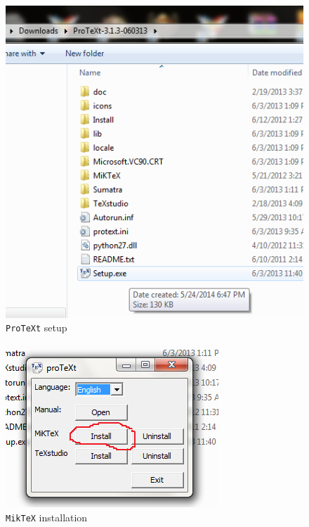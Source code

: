 \documentclass[12pt,a4paper]{article}
\begin{document}
\begin{figure}[H]
\centering
\includegraphics[scale=1.0]{ProTeXtSetup.png}
\caption{\texttt{ProTeXt} setup}
\label{protext-setup}
\end{figure}
\begin{figure}[H]
\centering
\includegraphics[scale=1.0]{MikTeXInstall.png}
\caption{\texttt{MikTeX} installation}
\label{miktex-install}
\end{figure}
\end{document}
